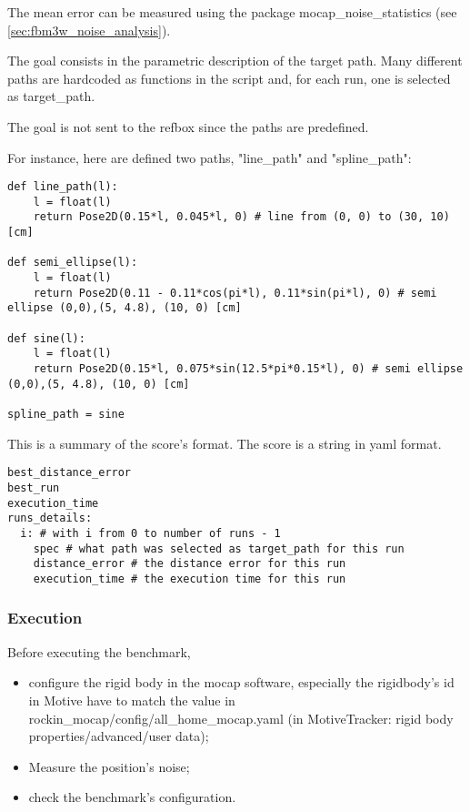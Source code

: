 \documentclass[a4paper]{article}
\begin{document}
The mean error can be measured using the package mocap\_noise\_statistics (see \ref{sec:fbm3w_noise_analysis}).

\label{sec:fbm3w_goal_data_format}

The goal consists in the parametric description of the target path.
Many different paths are hardcoded as functions in the script and, for each run, one is selected as target\_path.

The goal is not sent to the refbox since the paths are predefined.

For instance, here are defined two paths, "line\_path" and "spline\_path":
\begin{verbatim}
def line_path(l):
	l = float(l)
	return Pose2D(0.15*l, 0.045*l, 0) # line from (0, 0) to (30, 10) [cm]

def semi_ellipse(l):
	l = float(l)
	return Pose2D(0.11 - 0.11*cos(pi*l), 0.11*sin(pi*l), 0) # semi ellipse (0,0),(5, 4.8), (10, 0) [cm]

def sine(l):
	l = float(l)
	return Pose2D(0.15*l, 0.075*sin(12.5*pi*0.15*l), 0) # semi ellipse (0,0),(5, 4.8), (10, 0) [cm]

spline_path = sine
\end{verbatim} 

\label{sec:fbm3w_score_data_format}

This is a summary of the score's format.
The score is a string in yaml format.

\begin{verbatim}
best_distance_error
best_run
execution_time
runs_details:
  i: # with i from 0 to number of runs - 1
    spec # what path was selected as target_path for this run
    distance_error # the distance error for this run
    execution_time # the execution time for this run
\end{verbatim} 


\subsubsection{Execution}
\label{sec:fbm3w_execution}

Before executing the benchmark,
\begin{itemize}
  \item configure the rigid body in the mocap software, especially the rigidbody's id in Motive have to match the value in rockin\_mocap/config/all\_home\_mocap.yaml (in MotiveTracker: rigid body properties/advanced/user data);
  \item Measure the position's noise;
  \item check the benchmark's configuration.
\end{itemize}
\end{document}
